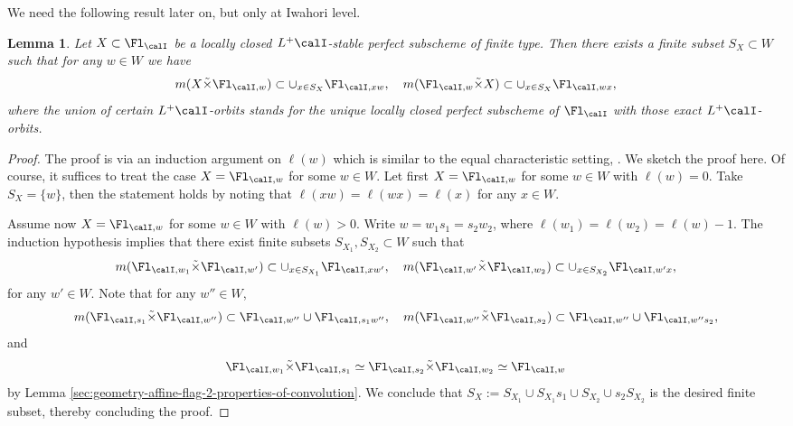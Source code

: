 \documentclass[10pt, reqno]{amsart}
\theoremstyle{plain}
\newtheorem{lemma}[theorem]{Lemma}
\theoremstyle{definition}
\numberwithin{equation}{section}
\begin{document}
	We need the following result later on, but only at Iwahori level.
	
	\begin{lemma} \label{importantlemma}
		Let $X\subset \Fl_\calI$ be a locally closed $L^+\calI$-stable perfect subscheme of finite type. Then there exists a finite subset $S_X \subset W$ such that for any $w\in W$ we have
		\begin{equation}
			m(X\tilde{\times} \Fl_{\calI,w})\subset \cup_{x\in S_X}\Fl_{\calI,xw}, \quad m(\Fl_{\calI,w}\tilde{\times} X)\subset \cup_{x\in S_X} \Fl_{\calI,wx},
		\end{equation}
		where the union of certain $L^+\calI$-orbits stands for the unique locally closed perfect subscheme of $\Fl_{\calI}$ with those exact $L^+\calI$-orbits.
	\end{lemma}
	\begin{proof}
		The proof is via an induction argument on $\ell(w)$ which is similar to the equal characteristic setting, \cite[Lemma 4.4.2]{AR}. We sketch the proof here. Of course, it suffices to treat the case $X=\Fl_{\calI,w}$ for some $w\in W$. Let first $X=\Fl_{\calI,w}$ for some $w\in W$ with $\ell(w)=0$. Take $S_X=\{w\}$, then the statement holds by noting that $\ell(xw)=\ell(wx)=\ell(x)$ for any $x\in W$.
		
		
		Assume now $X=\Fl_{\calI,w}$ for some $w\in W$ with $\ell(w)>0$. Write $w=w_1s_1=s_2w_2$, where $\ell(w_1)=\ell(w_2)=\ell(w)-1$. The induction hypothesis implies that there exist finite subsets $S_{X_1}, S_{X_2}\subset W$ such that 
		\begin{equation}
			m(\Fl_{\calI,w_1}\tilde{\times} \Fl_{\calI,w'})\subset \cup_{x\in S_{X_1}} \Fl_{\calI,xw'}, \quad
			m(\Fl_{\calI,w'}\tilde{\times}\Fl_{\calI,w_2})\subset \cup_{x \in S_{X_2}}\Fl_{\calI,w'x},
		\end{equation}
		for any $w'\in W$.
		Note that for any $w''\in W$,
		\begin{equation}
			m(\Fl_{\calI,s_1}\tilde{\times}\Fl_{\calI,w''})\subset \Fl_{\calI,w''}\cup  \Fl_{\calI,s_1w''},\quad m(\Fl_{\calI,w''}\tilde{\times}\Fl_{\calI,s_2})\subset \Fl_{\calI,w''}\cup  \Fl_{\calI,w''s_2},
		\end{equation}
		and
		\begin{equation}
			\Fl_{\calI,w_1}\tilde{\times}\Fl_{\calI,s_1}\simeq \Fl_{\calI,s_2}\tilde{\times}\Fl_{\calI,w_2}\simeq \Fl_{\calI,w}
		\end{equation}
		by Lemma \ref{sec:geometry-affine-flag-2-properties-of-convolution}.
		We conclude that $S_X:=S_{X_1}\cup S_{X_1}s_1\cup S_{X_2}\cup s_2 S_{X_2}$ is the desired finite subset, thereby concluding the proof.
	\end{proof}
	
\end{document}
